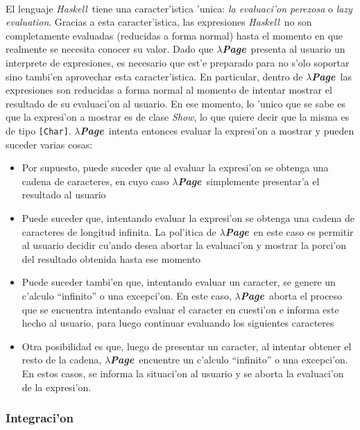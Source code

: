 \documentclass[a4paper]{article}
\newcommand{\haskell}{\textsl{Haskell}}
\newcommand{\hpage}{\textbf{\textsl{$\lambda$Page}}}
\begin{document}
\paragraph{}El lenguaje \haskell\ tiene una caracter'istica 'unica: \textsl{la evaluaci'on perezosa} o \textsl{lazy evaluation}.  Gracias a esta caracter'istica, las expresiones \haskell\ no son completamente evaluadas (reducidas a forma normal) hasta el momento en que realmente se necesita conocer su valor.  Dado que \hpage\ presenta al usuario un interprete de expresiones, es necesario que est'e preparado para no s'olo soportar sino tambi'en aprovechar esta caracter'istica.  En particular, dentro de \hpage\ las expresiones son reducidas a forma normal al momento de intentar mostrar el resultado de su evaluaci'on al usuario.  En ese momento, lo 'unico que se sabe es que la expresi'on a mostrar es de clase \textsl{Show}, lo que quiere decir que la misma es de tipo \texttt{[Char]}.  \hpage\ intenta entonces evaluar la expresi'on a mostrar y pueden suceder varias cosas:
\begin{itemize}
	\item Por supuesto, puede suceder que al evaluar la expresi'on se obtenga una cadena de caracteres, en cuyo caso \hpage\ simplemente presentar'a el resultado al usuario
	\item Puede suceder que, intentando evaluar la expresi'on se obtenga una cadena de caracteres de longitud infinita.  La pol'itica de \hpage\ en este caso es permitir al usuario decidir cu'ando desea abortar la evaluaci'on y mostrar la porci'on del resultado obtenida hasta ese momento
	\item Puede suceder tambi'en que, intentando evaluar un caracter, se genere un c'alculo ``infinito'' o una excepci'on.  En este caso, \hpage\ aborta el proceso que se encuentra intentando evaluar el caracter en cuesti'on e informa este hecho al usuario, para luego continuar evaluando los siguientes caracteres
	\item Otra posibilidad es que, luego de presentar un caracter, al intentar obtener el resto de la cadena, \hpage\ encuentre un c'alculo ``infinito'' o una excepci'on.  En estos casos, se informa la situaci'on al usuario y se aborta la evaluaci'on de la expresi'on.
\end{itemize}
\subsubsection{Integraci'on}
\end{document}
